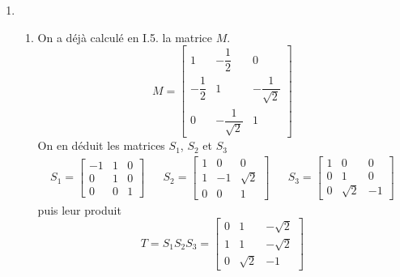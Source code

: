 \begin{enumerate}
\item \begin{enumerate}
 \item On a déjà calculé en I.5. la matrice $M$.
 \begin{displaymath}
 M=
\begin{bmatrix}
 1 & -\dfrac{1}{2} & 0 \\
-\dfrac{1}{2} & 1 & -\dfrac{1}{\sqrt{2}}\\
0 & -\dfrac{1}{\sqrt{2}} & 1
\end{bmatrix}
\end{displaymath}
On en déduit les matrices $S_1$, $S_2$ et $S_3$
\begin{align*}
 S_1=
\begin{bmatrix}
 -1 & 1 & 0 \\
 0 & 1 & 0 \\
0 & 0 & 1
\end{bmatrix}
& &
S_2=
\begin{bmatrix}
 1 & 0 & 0 \\
1 &-1 &\sqrt{2} \\
0 & 0 & 1
\end{bmatrix}
& &
S_3=
\begin{bmatrix}
1 & 0 & 0 \\
0 & 1 & 0 \\
0 & \sqrt{2} & -1
\end{bmatrix}
\end{align*}
puis leur produit
\begin{displaymath}
 T = S_1 S_2 S_3 =
\begin{bmatrix}
 0 & 1 & -\sqrt{2} \\
1 & 1 & -\sqrt{2} \\
0 & \sqrt{2} & -1
\end{bmatrix}
\end{displaymath}


\end{enumerate}
\end{enumerate}
